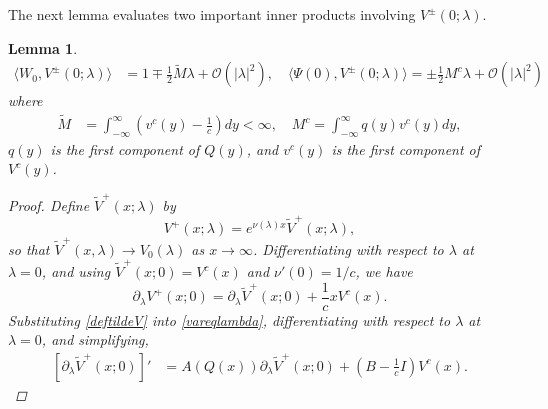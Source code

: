 \documentclass[10pt,reqno]{amsart}
\theoremstyle{plain}
\newtheorem{lemma}[theorem]{Lemma}
\theoremstyle{definition}
\theoremstyle{remark}
\numberwithin{theorem}{section}
\numberwithin{equation}{section}
\begin{document}
The next lemma evaluates two important inner products involving $V^\pm(0; \lambda)$.

\begin{lemma}\label{lemma:VpmPsiIP}
\begin{equation}\label{VpmIPs}
\begin{aligned}
\langle W_0, V^\pm(0; \lambda) \rangle &= 1 \mp \frac{1}{2} \tilde{M}\lambda + \mathcal{O}(|\lambda|^2), \quad
\langle \Psi(0), V^\pm(0; \lambda) \rangle = \pm \frac{1}{2} M^c \lambda + \mathcal{O}(|\lambda|^2)
\end{aligned}
\end{equation}
where
\begin{align*}
\tilde{M} &= \int_{-\infty}^{\infty} \left(v^c(y) - \frac{1}{c}\right) dy < \infty, \quad
M^c = \int_{-\infty}^\infty q(y) v^c(y) dy,
\end{align*}
$q(y)$ is the first component of $Q(y)$, and $v^c(y)$ is the first component of $V^c(y)$.
\begin{proof}
Define $\tilde{V}^+(x; \lambda)$ by
\begin{equation}\label{deftildeV}
V^+(x; \lambda) = e^{\nu(\lambda)x}\tilde{V}^+(x; \lambda),
\end{equation}
so that $\tilde{V}^+(x, \lambda) \rightarrow V_0(\lambda)$ as $x \rightarrow \infty$. Differentiating with respect to $\lambda$ at $\lambda = 0$, and using $\tilde{V}^+(x; 0) = V^c(x)$ and $\nu'(0) = 1/c$, we have
\begin{equation}\label{VtildeVderiv}
\partial_\lambda V^+(x; 0)
= \partial_\lambda \tilde{V}^+(x; 0) + \frac{1}{c} x V^c(x).
\end{equation}
Substituting \cref{deftildeV} into \cref{vareqlambda}, differentiating with respect to $\lambda$ at $\lambda = 0$, and simplifying, 
\begin{align}\label{tildeVsolves}
[\partial_\lambda \tilde{V}^+(x; 0)]' &= A(Q(x))\partial_\lambda \tilde{V}^+(x; 0) + \left( B - \frac{1}{c}I\right) V^c(x).
\end{align}


\end{proof}
\end{lemma}
\end{document}
